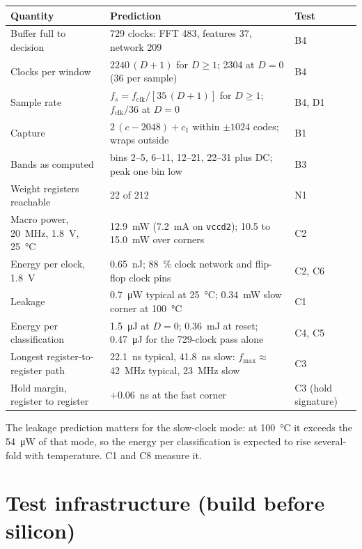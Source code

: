\documentclass[10pt]{article}
\begin{document}
{\small
\begin{longtable}{@{}L{5.2cm}L{5.6cm}L{4.2cm}@{}}
\toprule
Quantity & Prediction & Test\\
\midrule
\endhead
Buffer full to decision & 729 clocks: FFT 483, features 37, network 209 & B4\\
Clocks per window & $2240\,(D+1)$ for $D\ge1$; \num{2304} at $D=0$ (36 per sample) & B4\\
Sample rate & $f_s=f_{\mathrm{clk}}/[35\,(D+1)]$ for $D\ge1$; $f_{\mathrm{clk}}/36$ at $D=0$ & B4, D1\\
Capture & $2\,(c-2048)+c_1$ within $\pm1024$ codes; wraps outside & B1\\
Bands as computed & bins 2--5, 6--11, 12--21, 22--31 plus DC; peak one bin low & B3\\
Weight registers reachable & 22 of 212 & N1\\
Macro power, \SI{20}{\mega\hertz}, \SI{1.8}{\volt}, \SI{25}{\celsius} &
\SI{12.9}{\milli\watt} (\SI{7.2}{\milli\ampere} on \texttt{vccd2}); 10.5 to \SI{15.0}{\milli\watt} over corners & C2\\
Energy per clock, \SI{1.8}{\volt} & \SI{0.65}{\nano\joule}; \SI{88}{\percent} clock network and flip-flop clock pins & C2, C6\\
Leakage & \SI{0.7}{\micro\watt} typical at \SI{25}{\celsius}; \SI{0.34}{\milli\watt} slow corner at \SI{100}{\celsius} & C1\\
Energy per classification & \SI{1.5}{\micro\joule} at $D=0$; \SI{0.36}{\milli\joule} at reset; \SI{0.47}{\micro\joule} for the 729-clock pass alone & C4, C5\\
Longest register-to-register path & \SI{22.1}{\nano\second} typical, \SI{41.8}{\nano\second} slow: $f_{\max}\approx$ \SI{42}{\mega\hertz} typical, \SI{23}{\mega\hertz} slow & C3\\
Hold margin, register to register & $+$\SI{0.06}{\nano\second} at the fast corner & C3 (hold signature)\\
\bottomrule
\end{longtable}}

\noindent The leakage prediction matters for the slow-clock mode: at
\SI{100}{\celsius} it exceeds the \SI{54}{\micro\watt} of that mode, so
the energy per classification is expected to rise several-fold with
temperature. C1 and C8 measure it.

\section{Test infrastructure (build before silicon)}
\label{sec:infra}
\end{document}
